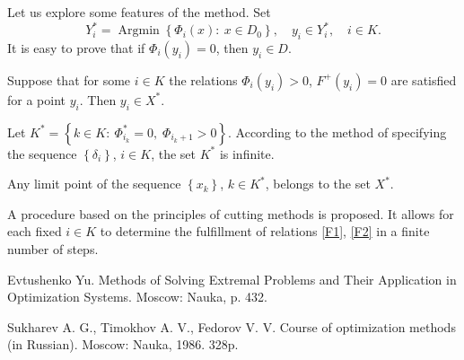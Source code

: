 \documentclass[12pt]{llncs}
\begin{document}
Let us explore some features of the method. Set
$$Y_i^* = \operatorname{Argmin} \left\{ {{\Phi _i}\left( x \right):\:x \in {D_0}} \right\},\quad {y_i} \in Y_i^*,\quad i \in K.
$$
It is easy to prove that if ${\Phi _i}\left( {{y_i}} \right) = 0$, then ${y_i} \in D$.

\begin{theorem}
	\label{theor_01}
	Suppose that for some $i \in K$ the relations ${\Phi _i}\left( {{y_i}} \right) > 0$, ${F^ + }\left( {{y_i}} \right) = 0$ are satisfied for a point $y_i$. Then ${y_i} \in {X^*}$. 
\end{theorem}

Let ${K^*} = \left\{ {k \in K:\:\Phi _{{i_k}}^* = 0,\;{\Phi _{{i_k} + 1}} > 0} \right\}$. According to the method of specifying the sequence $\left\{ {{\delta _i}} \right\}$, $i \in K$, the set ${K^*}$ is infinite.

\begin{theorem}
	\label{theor_02}
	Any limit point of the sequence $\left\{ {{x_k}} \right\}$, $k \in {K^*}$, belongs to the set ${X^*}$. 
\end{theorem}

A procedure based on the principles of cutting methods is proposed. It allows for each fixed $i \in K$ to determine the fulfillment of relations \eqref{F1}, \eqref{F2} in a finite number of steps.

%
%
%
%
%
%
\begin{thebibliography}{99}
Evtushenko Yu. Methods of Solving Extremal Problems and Their Application in Optimization Systems. Moscow: Nauka, p. 432.

Sukharev A. G., Timokhov A. V., Fedorov V. V. Course of optimization methods (in Russian). Moscow: Nauka, 1986. 328p.
\end{thebibliography}
\end{document}
